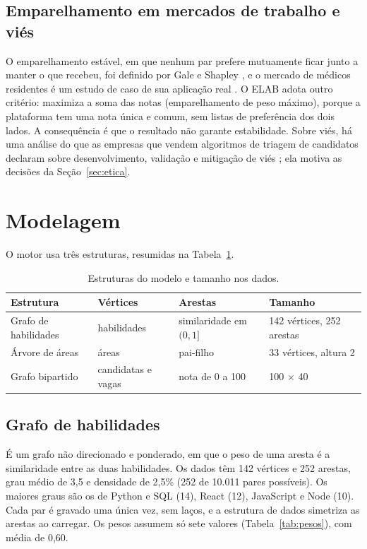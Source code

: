 \documentclass[12pt]{article}
\begin{document}
\subsection{Emparelhamento em mercados de trabalho e viés}

O emparelhamento estável, em que nenhum par prefere mutuamente ficar junto a manter o que recebeu, foi definido por Gale e Shapley \cite{gale1962}, e o mercado de médicos residentes é um estudo de caso de sua aplicação real \cite{roth1984}. O ELAB adota outro critério: maximiza a soma das notas (emparelhamento de peso máximo), porque a plataforma tem uma nota única e comum, sem listas de preferência dos dois lados. A consequência é que o resultado não garante estabilidade. Sobre viés, há uma análise do que as empresas que vendem algoritmos de triagem de candidatos declaram sobre desenvolvimento, validação e mitigação de viés \cite{raghavan2019}; ela motiva as decisões da Seção~\ref{sec:etica}.

\section{Modelagem}
\label{sec:mod}

O motor usa três estruturas, resumidas na Tabela~\ref{tab:estruturas}.

\begin{table}[ht]
\centering
\caption{Estruturas do modelo e tamanho nos dados.}
\label{tab:estruturas}
\begin{tabular}{p{3.6cm}p{2.2cm}p{3.2cm}p{3.8cm}}
\hline
Estrutura & Vértices & Arestas & Tamanho \\
\hline
Grafo de habilidades & habilidades & similaridade em $(0,1]$ & 142 vértices, 252 arestas \\
Árvore de áreas & áreas & pai-filho & 33 vértices, altura 2 \\
Grafo bipartido & candidatas e vagas & nota de 0 a 100 & 100 $\times$ 40 \\
\hline
\end{tabular}
\end{table}

\subsection{Grafo de habilidades}

É um grafo não direcionado e ponderado, em que o peso de uma aresta é a similaridade entre as duas habilidades. Os dados têm 142 vértices e 252 arestas, grau médio de 3,5 e densidade de 2,5\% (252 de 10.011 pares possíveis). Os maiores graus são os de Python e SQL (14), React (12), JavaScript e Node (10). Cada par é gravado uma única vez, sem laços, e a estrutura de dados simetriza as arestas ao carregar. Os pesos assumem só sete valores (Tabela~\ref{tab:pesos}), com média de 0,60.
\end{document}
